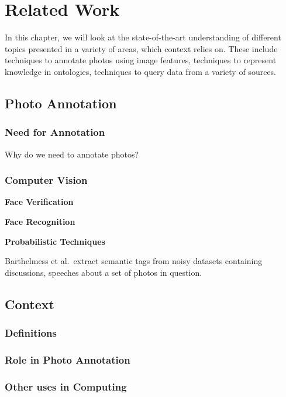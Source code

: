 \chapter{Related Work}

In this chapter, we will look at the state-of-the-art understanding of different topics presented in a variety of areas, which context relies on. These include techniques to annotate photos using image features, techniques to represent knowledge in ontologies, techniques to query data from a variety of sources.

\section{Photo Annotation}

\subsection{Need for Annotation}

Why do we need to annotate photos?

\subsection{Computer Vision}

\textbf{Face Verification}

\textbf{Face Recognition}

\textbf{Probabilistic Techniques}

Barthelmess et al.\ extract semantic tags from noisy datasets containing discussions, speeches about a set of photos in question\cite{barthelmess2007toward}. 

\section{Context}

\subsection{Definitions}

\subsection{Role in Photo Annotation}

\subsection{Other uses in Computing}

